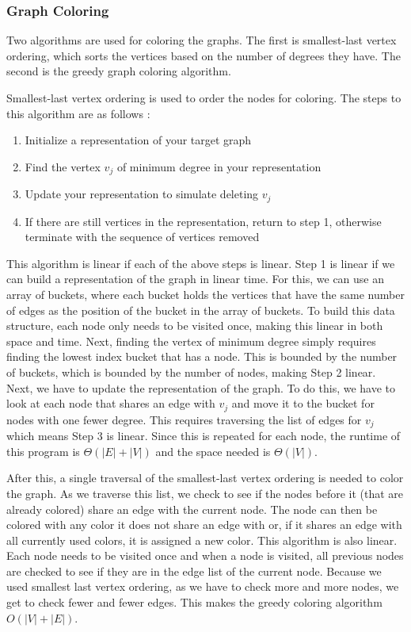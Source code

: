 \documentclass{article}
\begin{document}
        \subsubsection{Graph Coloring}
        Two algorithms are used for coloring the graphs. The first is smallest-last vertex ordering, which sorts the vertices based on the number of degrees they have. The second is the greedy graph coloring algorithm.
        \par
        Smallest-last vertex ordering is used to order the nodes for coloring. The steps to this algorithm are as follows \cite{slv}:

        \begin{enumerate}
            \item Initialize a representation of your target graph
            \item Find the vertex $v_j$ of minimum degree in your representation
            \item Update your representation to simulate deleting $v_j$
            \item If there are still vertices in the representation, return to step 1, otherwise terminate with the sequence of vertices removed
        \end{enumerate}

        This algorithm is linear if each of the above steps is linear. Step 1 is linear if we can build a representation of the graph in linear time. For this, we can use an array of buckets, where each bucket holds the vertices that have the same number of edges as the position of the bucket in the array of buckets. To build this data structure, each node only needs to be visited once, making this linear in both space and time. Next, finding the vertex of minimum degree simply requires finding the lowest index bucket that has a node. This is bounded by the number of buckets, which is bounded by the number of nodes, making Step 2 linear. Next, we have to update the representation of the graph. To do this, we have to look at each node that shares an edge with $v_j$ and move it to the bucket for nodes with one fewer degree. This requires traversing the list of edges for $v_j$ which means Step 3 is linear. Since this is repeated for each node, the runtime of this program is $\Theta\left(|E| + |V|\right)$ and the space needed is $\Theta(|V|)$.
        \par
        After this, a single traversal of the smallest-last vertex ordering is needed to color the graph. As we traverse this list, we check to see if the nodes before it (that are already colored) share an edge with the current node. The node can then be colored with any color it does not share an edge with or, if it shares an edge with all currently used colors, it is assigned a new color. This algorithm is also linear. Each node needs to be visited once and when a node is visited, all previous nodes are checked to see if they are in the edge list of the current node. Because we used smallest last vertex ordering, as we have to check more and more nodes, we get to check fewer and fewer edges. This makes the greedy coloring algorithm $O(|V| + |E|)$.
\end{document}
